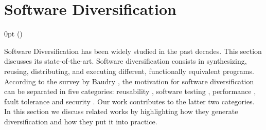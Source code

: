 \section{Software Diversification  }
\label{sota:sota}
\def\checkmark{\tikz\fill[scale=0.4](0,.35) -- (.25,0) -- (1,.7) -- (.25,.15) -- cycle;} 

  {\topsep}%
  {\topsep}%
  {\itshape}%
  {0pt}%
  {\bfseries}%
  {}%
  { }%
  {()\textnormal{}}

\def\Gnospace~{G{}}
\theoremstyle{sota}
\newtheorem{goal}{G}
\providecommand*{\definitionautorefname}{\Gnospace}
\newcommand{\goalautorefname}{\Gnospace}


\def\Snospace~{S{}}
\theoremstyle{sota}
\newtheorem{strategy}{S}
\providecommand*{\definitionautorefname}{\Snospace}
\newcommand{\strategyautorefname}{\Snospace}

\def\Unospace~{U{}}
\theoremstyle{sota}
\newtheorem{usage}{U}
\providecommand*{\definitionautorefname}{\Unospace}
\newcommand{\usageautorefname}{\Unospace}









Software Diversification has been widely studied in the past decades. This section discusses its state-of-the-art.
Software diversification consists in synthesizing, reusing, distributing, and executing different, functionally equivalent programs. 
According to the survey by Baudry \etal \cite{natural_diversity}, the motivation for software diversification can be separated in five categories: reusability \cite{pohl2005software}, software testing \cite{Chen2010AdaptiveRT}, performance \cite{10.1145/2025113.2025133}, fault tolerance \cite{1659219} and security \cite{cohen1993operating}. Our work contributes to the latter two categories. In this section we discuss related works by highlighting how they generate diversification and how they put it into practice. 

